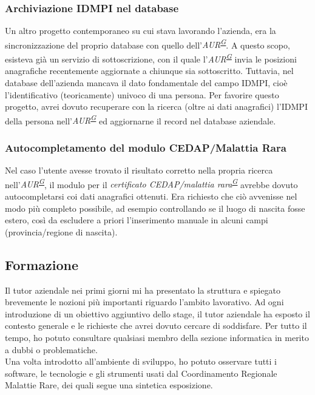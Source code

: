 \documentclass[a4paper]{article}
\newcommand{\crmr}{Coordinamento Regionale Malattie Rare}
\begin{document}
\subsubsection{Archiviazione IDMPI nel database}
Un altro progetto contemporaneo su cui stava lavorando l'azienda, era la sincronizzazione del proprio database con quello dell'\textit{AUR\textsuperscript{\hyperref[sec:gl]{G}}}. A questo scopo, esisteva già un servizio di sottoscrizione, con il quale l'\textit{AUR\textsuperscript{\hyperref[sec:gl]{G}}} invia le posizioni anagrafiche recentemente aggiornate a chiunque sia sottoscritto. Tuttavia, nel database dell'azienda mancava il dato fondamentale del campo IDMPI, cioè l'identificativo (teoricamente) univoco di una persona. Per favorire questo progetto, avrei dovuto recuperare con la ricerca (oltre ai dati anagrafici) l'IDMPI della persona nell'\textit{AUR\textsuperscript{\hyperref[sec:gl]{G}}} ed aggiornarne il record nel database aziendale.

\subsubsection{Autocompletamento del modulo CEDAP/Malattia Rara}
Nel caso l'utente avesse trovato il risultato corretto nella propria ricerca nell'\textit{AUR\textsuperscript{\hyperref[sec:gl]{G}}}, il modulo per il \textit{certificato CEDAP/malattia rara\textsuperscript{\hyperref[sec:gl]{G}}} avrebbe dovuto autocompletarsi coi dati anagrafici ottenuti. Era richiesto che ciò avvenisse nel modo più completo possibile, ad esempio controllando se il luogo di nascita fosse estero, così da escludere a priori l'inserimento manuale in alcuni campi (provincia/regione di nascita).

\subsection{Formazione}
Il tutor aziendale nei primi giorni mi ha presentato la struttura e spiegato brevemente le nozioni più importanti riguardo l'ambito lavorativo. Ad ogni introduzione di un obiettivo aggiuntivo dello stage, il tutor aziendale ha esposto il contesto generale e le richieste che avrei dovuto cercare di soddisfare. Per tutto il tempo, ho potuto consultare qualsiasi membro della sezione informatica in merito a dubbi o problematiche. 
\\
Una volta introdotto all'ambiente di sviluppo, ho potuto osservare tutti i software, le tecnologie e gli strumenti usati dal \crmr, dei quali segue una sintetica esposizione.
\end{document}
